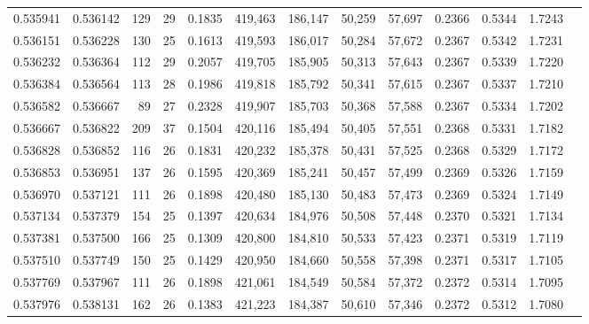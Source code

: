 \begin{tabular}{rrrrrrrrrrrrr}
0.535941 & 0.536142 &    129 &    29 &                                     0.1835 & 419,463 & 186,147 &  50,259 &  57,697 & 0.2366 & 0.5344 & 1.7243 \\
0.536151 & 0.536228 &    130 &    25 &                                     0.1613 & 419,593 & 186,017 &  50,284 &  57,672 & 0.2367 & 0.5342 & 1.7231 \\
0.536232 & 0.536364 &    112 &    29 &                                     0.2057 & 419,705 & 185,905 &  50,313 &  57,643 & 0.2367 & 0.5339 & 1.7220 \\
0.536384 & 0.536564 &    113 &    28 &                                     0.1986 & 419,818 & 185,792 &  50,341 &  57,615 & 0.2367 & 0.5337 & 1.7210 \\
0.536582 & 0.536667 &     89 &    27 &                                     0.2328 & 419,907 & 185,703 &  50,368 &  57,588 & 0.2367 & 0.5334 & 1.7202 \\
0.536667 & 0.536822 &    209 &    37 &                                     0.1504 & 420,116 & 185,494 &  50,405 &  57,551 & 0.2368 & 0.5331 & 1.7182 \\
0.536828 & 0.536852 &    116 &    26 &                                     0.1831 & 420,232 & 185,378 &  50,431 &  57,525 & 0.2368 & 0.5329 & 1.7172 \\
0.536853 & 0.536951 &    137 &    26 &                                     0.1595 & 420,369 & 185,241 &  50,457 &  57,499 & 0.2369 & 0.5326 & 1.7159 \\
0.536970 & 0.537121 &    111 &    26 &                                     0.1898 & 420,480 & 185,130 &  50,483 &  57,473 & 0.2369 & 0.5324 & 1.7149 \\
0.537134 & 0.537379 &    154 &    25 &                                     0.1397 & 420,634 & 184,976 &  50,508 &  57,448 & 0.2370 & 0.5321 & 1.7134 \\
0.537381 & 0.537500 &    166 &    25 &                                     0.1309 & 420,800 & 184,810 &  50,533 &  57,423 & 0.2371 & 0.5319 & 1.7119 \\
0.537510 & 0.537749 &    150 &    25 &                                     0.1429 & 420,950 & 184,660 &  50,558 &  57,398 & 0.2371 & 0.5317 & 1.7105 \\
0.537769 & 0.537967 &    111 &    26 &                                     0.1898 & 421,061 & 184,549 &  50,584 &  57,372 & 0.2372 & 0.5314 & 1.7095 \\
0.537976 & 0.538131 &    162 &    26 &                                     0.1383 & 421,223 & 184,387 &  50,610 &  57,346 & 0.2372 & 0.5312 & 1.7080 \\

\end{tabular}
